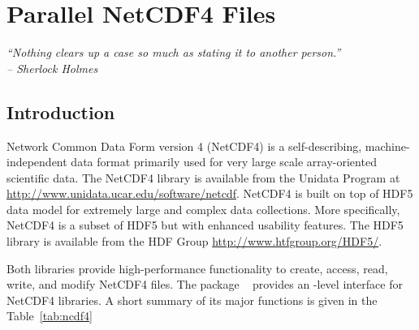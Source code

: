 
\chapter{Parallel NetCDF4 Files}
\label{chp:pbdNCDF4}

{\it
``Nothing clears up a case so much as stating it to another person.'' \\
\--- Sherlock Holmes
}
\vspace{0.5cm}


\section{Introduction}
\label{sec:pbdNCDF4_introduction}

Network Common Data Form version 4 (NetCDF4) is
a self-describing, machine-independent data format primarily used for very 
large scale array-oriented scientific data.  The NetCDF4 library is available 
from the Unidata Program at \url{http://www.unidata.ucar.edu/software/netcdf}. 
NetCDF4 is built on top of HDF5 data model for extremely 
large and complex data collections.  More specifically, NetCDF4 is a subset of 
HDF5 but with enhanced usability features. The HDF5 library is available from 
the HDF Group \url{http://www.htfgroup.org/HDF5/}.

Both libraries provide high-performance functionality to create, access,
read, write, and modify NetCDF4 files.  The  package 
~\citep{ncdf4} provides an 
-level interface for NetCDF4 libraries.  A short summary of its
major functions is given in the Table~\ref{tab:ncdf4}

